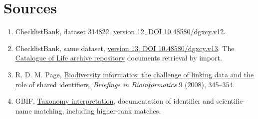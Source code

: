 \documentclass[11pt]{article}
\begin{document}
\section*{Sources}
\begin{enumerate}
\item ChecklistBank, dataset 314822, \href{https://doi.org/10.48580/dgxcy.v12}{version 12, DOI 10.48580/dgxcy.v12}.
\item ChecklistBank, same dataset, \href{https://doi.org/10.48580/dgxcy.v13}{version 13, DOI 10.48580/dgxcy.v13}. The \href{https://www.catalogueoflife.org/2022/08/15/archive-repository}{Catalogue of Life archive repository} documents retrieval by import.
\item R. D. M. Page, \href{https://doi.org/10.1093/bib/bbn022}{Biodiversity informatics: the challenge of linking data and the role of shared identifiers}, \emph{Briefings in Bioinformatics} 9 (2008), 345--354.
\item GBIF, \href{https://techdocs.gbif.org/en/data-processing/taxonomy-interpretation}{Taxonomy interpretation}, documentation of identifier and scientific-name matching, including higher-rank matches.
\end{enumerate}
\end{document}
